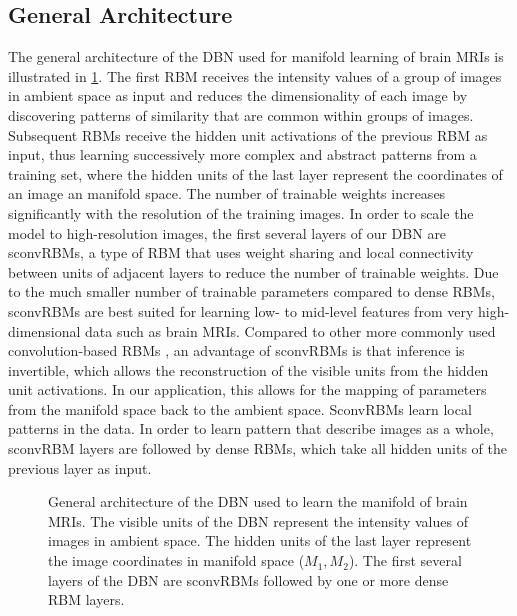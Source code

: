 \subsection{General Architecture}

The general architecture of the DBN used for manifold learning of brain MRIs is
illustrated in \ref{fig:manidbn}. The first RBM receives the intensity values of
a group of images in ambient space as input and reduces the dimensionality of
each image by discovering patterns of similarity that are common within groups
of images. Subsequent RBMs receive the hidden unit activations of the previous
RBM as input, thus learning successively more complex and abstract patterns from
a training set, where the hidden units of the last layer represent the
coordinates of an image an manifold space. The number of trainable weights
increases significantly with the resolution of the training images. In order to
scale the model to high-resolution images, the first several layers of our DBN
are sconvRBMs, a type of RBM that uses weight sharing and local connectivity
between units of adjacent layers to reduce the number of trainable weights. Due
to the much smaller number of trainable parameters compared to dense RBMs,
sconvRBMs are best suited for learning low- to mid-level features from very
high-dimensional data such as brain MRIs. Compared to other more commonly used
convolution-based RBMs \cite{lee2009}, an advantage of sconvRBMs is that
inference is invertible, which allows the reconstruction of the visible units
from the hidden unit activations. In our application, this allows for the
mapping of parameters from the manifold space back to the ambient space.
SconvRBMs learn local patterns in the data. In order to learn pattern that
describe images as a whole, sconvRBM layers are followed by dense RBMs, which
take all hidden units of the previous layer as input.

\begin{figure}
\centering


\caption{General architecture of the DBN used to learn the manifold of brain
MRIs. The visible units of the DBN represent the intensity values of images in
ambient space. The hidden units of the last layer represent the image
coordinates in manifold space ($M_1, M_2$). The first several layers of the DBN
are sconvRBMs followed by one or more dense RBM layers.}

\label{fig:manidbn}
\end{figure}

